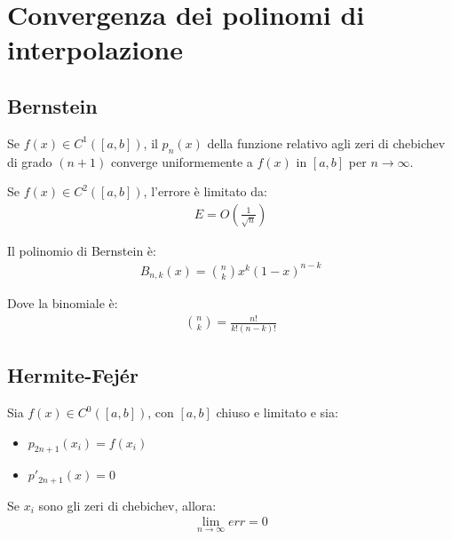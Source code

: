 \chapter{Convergenza dei polinomi di interpolazione}

\section{Bernstein}
Se $f(x) \in C^1([a, b])$, il $p_n(x)$ della funzione relativo agli zeri di chebichev di grado $(n+1)$
converge uniformemente a $f(x)$ in $[a, b]$ per $n \rightarrow \infty$.


Se $f(x) \in C^2([a, b])$, l'errore è limitato da:
\begin{align}
  E = O(\frac{1}{\sqrt{n}})
\end{align}

Il polinomio di Bernstein è:
\begin{align}
  B_{n, k}(x) = \binom{n}{k} x^k (1-x)^{n-k}
\end{align}

Dove la binomiale è:
\begin{align}
  \binom{n}{k} = \frac{n!}{k!(n-k)!}
\end{align}





\section{Hermite-Fejér}
Sia $f(x) \in C^0([a, b])$, con $[a, b]$ chiuso e limitato e sia:
\begin{itemize}
  \item $p_{2n+1}(x_i) = f(x_i)$
  \item $p'_{2n+1}(x) = 0$
\end{itemize}

Se $x_i$ sono gli zeri di chebichev, allora:
\begin{align}
  \lim_{n \rightarrow \infty} err = 0
\end{align}
